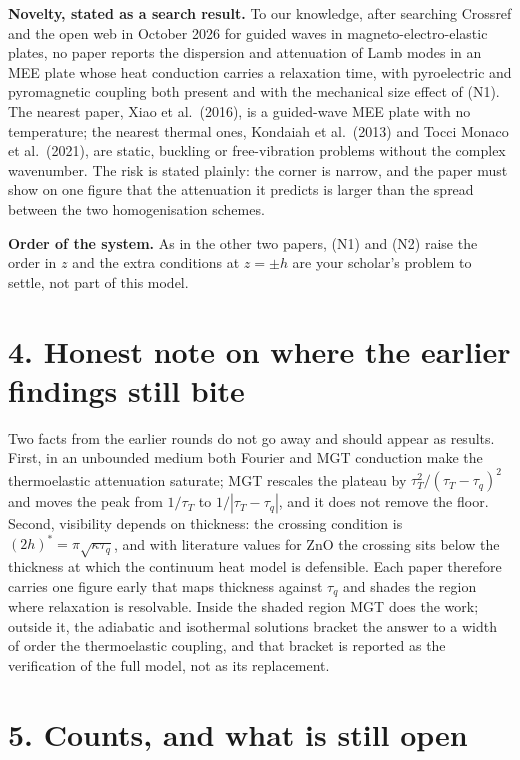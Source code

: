 \documentclass[11pt]{article}
\begin{document}
\noindent\textbf{Novelty, stated as a search result.} To our knowledge, after searching Crossref and the
open web in October 2026 for guided waves in magneto-electro-elastic plates, no paper reports the
dispersion and attenuation of Lamb modes in an MEE plate whose heat conduction carries a relaxation time,
with pyroelectric and pyromagnetic coupling both present and with the mechanical size effect of (N1). The
nearest paper, Xiao et al.\ (2016), is a guided-wave MEE plate with no temperature; the nearest thermal
ones, Kondaiah et al.\ (2013) and Tocci Monaco et al.\ (2021), are static, buckling or free-vibration
problems without the complex wavenumber. The risk is stated plainly: the corner is narrow, and the paper
must show on one figure that the attenuation it predicts is larger than the spread between the two
homogenisation schemes.

\noindent\textbf{Order of the system.} As in the other two papers, (N1) and (N2) raise the order in $z$
and the extra conditions at $z=\pm h$ are your scholar's problem to settle, not part of this model.

\section*{4. Honest note on where the earlier findings still bite}

Two facts from the earlier rounds do not go away and should appear as results. First, in an unbounded
medium both Fourier and MGT conduction make the thermoelastic attenuation saturate; MGT rescales the
plateau by $\tau_T^2/(\tau_T-\tau_q)^2$ and moves the peak from $1/\tau_T$ to $1/|\tau_T-\tau_q|$, and it
does not remove the floor. Second, visibility depends on thickness: the crossing condition is
$(2h)^*=\pi\sqrt{\kappa\tau_q}$, and with literature values for ZnO the crossing sits below the thickness
at which the continuum heat model is defensible. Each paper therefore carries one figure early that maps
thickness against $\tau_q$ and shades the region where relaxation is resolvable. Inside the shaded region
MGT does the work; outside it, the adiabatic and isothermal solutions bracket the answer to a width of
order the thermoelastic coupling, and that bracket is reported as the verification of the full model, not
as its replacement.

\section*{5. Counts, and what is still open}
\end{document}
